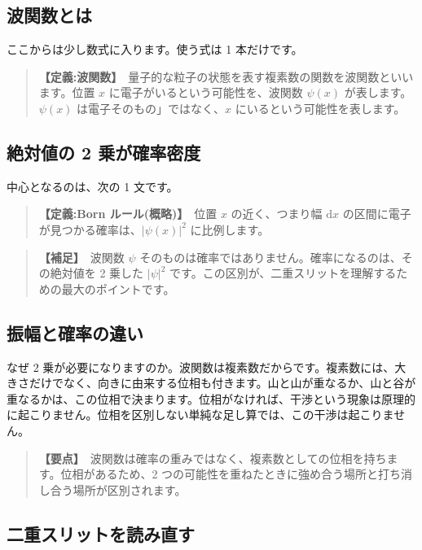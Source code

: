 \documentclass{article}
\begin{document}
\subsection{波関数とは}

ここからは少し数式に入ります。使う式は 1 本だけです。

\begin{quote}
\textbf{【定義:波関数】}\ 量子的な粒子の状態を表す複素数の関数を波関数といいます。位置 \(x\) に電子がいるという可能性を、波関数 \(\psi(x)\) が表します。\(\psi(x)\) は電子そのもの」ではなく、\(x\) にいるという可能性を表します。
\end{quote}

\subsection{絶対値の 2 乗が確率密度}

中心となるのは、次の 1 文です。

\begin{quote}
\textbf{【定義:Born ルール(概略)】}\ 位置 \(x\) の近く、つまり幅 \(\mathrm{d}x\) の区間に電子が見つかる確率は、\(|\psi(x)|^2\) に比例します。
\end{quote}

\begin{quote}
\textbf{【補足】}\ 波関数 \(\psi\) そのものは確率ではありません。確率になるのは、その絶対値を 2 乗した \(|\psi|^2\) です。この区別が、二重スリットを理解するための最大のポイントです。
\end{quote}

\subsection{振幅と確率の違い}

なぜ 2 乗が必要になりますのか。波関数は複素数だからです。複素数には、大きさだけでなく、向きに由来する位相も付きます。山と山が重なるか、山と谷が重なるかは、この位相で決まります。位相がなければ、干渉という現象は原理的に起こりません。位相を区別しない単純な足し算では、この干渉は起こりません。

\begin{quote}
\textbf{【要点】}\ 波関数は確率の重みではなく、複素数としての位相を持ちます。位相があるため、2 つの可能性を重ねたときに強め合う場所と打ち消し合う場所が区別されます。
\end{quote}

\subsection{二重スリットを読み直す}
\end{document}
